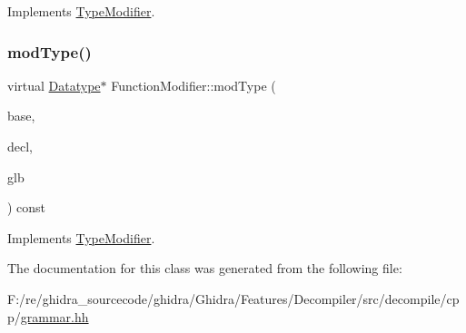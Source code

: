 Implements \mbox{\hyperlink{class_type_modifier_a67477f048c4ede6b0a0419bf399f2113}{Type\+Modifier}}.

\mbox{\label{class_function_modifier_ac60a79708a408ad683a70e6f3310394c}} 
\subsubsection{\texorpdfstring{modType()}{modType()}}
{\footnotesize\ttfamily virtual \mbox{\hyperlink{class_datatype}{Datatype}}$\ast$ Function\+Modifier\+::mod\+Type (\begin{DoxyParamCaption}\item[{\mbox{\hyperlink{class_datatype}{Datatype}} $\ast$}]{base,  }\item[{const \mbox{\hyperlink{class_type_declarator}{Type\+Declarator}} $\ast$}]{decl,  }\item[{\mbox{\hyperlink{class_architecture}{Architecture}} $\ast$}]{glb }\end{DoxyParamCaption}) const\hspace{0.3cm}{\ttfamily [virtual]}}



Implements \mbox{\hyperlink{class_type_modifier_aa476545f31ae45f4bd39c8afb7403406}{Type\+Modifier}}.



The documentation for this class was generated from the following file\+:\begin{DoxyCompactItemize}
\item 
F\+:/re/ghidra\+\_\+sourcecode/ghidra/\+Ghidra/\+Features/\+Decompiler/src/decompile/cpp/\mbox{\hyperlink{grammar_8hh}{grammar.\+hh}}\end{DoxyCompactItemize}
